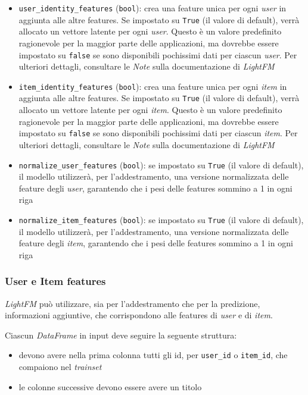 \begin{itemize}
    \item \texttt{user\_identity\_features} (\texttt{bool}): crea una feature unica per ogni \textit{user} in aggiunta alle altre features. Se impostato su \texttt{True} (il valore di default), verrà allocato un vettore latente per ogni \textit{user}.  Questo è un valore predefinito ragionevole per la maggior parte delle applicazioni, ma dovrebbe essere impostato su \texttt{false} se sono disponibili pochissimi dati per ciascun \textit{user}. Per ulteriori dettagli, consultare le \textit{Note} sulla documentazione di \textit{LightFM}
    \item \texttt{item\_identity\_features} (\texttt{bool}): crea una feature unica per ogni \textit{item} in aggiunta alle altre features. Se impostato su \texttt{True} (il valore di default), verrà allocato un vettore latente per ogni \textit{item}. Questo è un valore predefinito ragionevole per la maggior parte delle applicazioni, ma dovrebbe essere impostato su \texttt{false} se sono disponibili pochissimi dati per ciascun \textit{item}. Per ulteriori dettagli, consultare le \textit{Note} sulla documentazione di \textit{LightFM}
    \item \texttt{normalize\_user\_features} (\texttt{bool}): se impostato su \texttt{True} (il valore di default), il modello utilizzerà, per l'addestramento, una versione normalizzata delle feature degli \textit{user}, garantendo che i pesi delle features sommino a 1 in ogni riga
    \item \texttt{normalize\_item\_features} (\texttt{bool}): se impostato su \texttt{True} (il valore di default), il modello utilizzerà, per l'addestramento, una versione normalizzata delle feature degli \textit{item}, garantendo che i pesi delle features sommino a 1 in ogni riga
\end{itemize}

\subsubsection{User e Item features}

\textit{LightFM} può utilizzare, sia per l'addestramento che per la predizione, informazioni aggiuntive, che corrispondono alle features di \textit{user} e di \textit{item}. 

Ciascun \textit{DataFrame} in input deve seguire la seguente struttura:
\begin{itemize}
    \item devono avere nella prima colonna tutti gli id, per \texttt{user\_id} o \texttt{item\_id}, che compaiono nel \textit{trainset}
    \item le colonne successive devono essere avere un titolo
\end{itemize}

